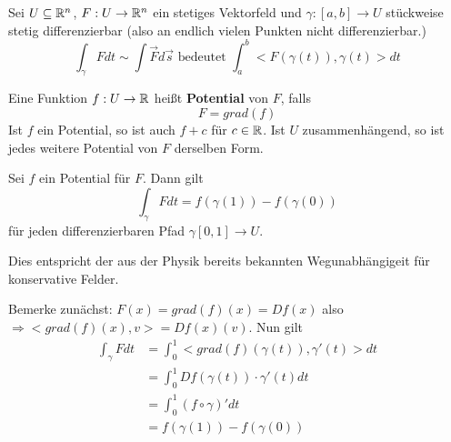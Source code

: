 \documentclass[main.tex]{subfiles}
\begin{document}
\begin{Definition}[Potential]
  Sei $U \subseteq \mathbb{R}^n$, $F : U \to \mathbb{R}^n$ ein stetiges Vektorfeld und $\gamma:[a,b] \to U$ stückweise stetig differenzierbar (also an endlich vielen Punkten nicht differenzierbar.)
  $$\int_\gamma F dt \sim \int \vec{F} d\vec{s} \text{ bedeutet } \int_a^b<F(\gamma(t)),\gamma(t)> dt$$

  Eine Funktion $f:U\to \mathbb{R}$ heißt \textbf{Potential} von $F$, falls
  $$F = grad(f)$$
  Ist $f$ ein Potential, so ist auch $f+c$ für $c \in \mathbb{R}$. Ist $U$ zusammenhängend, so ist jedes weitere Potential von $F$ derselben Form.
\end{Definition}

\begin{Theorem}
  Sei $f$ ein Potential für $F$. Dann gilt
  $$\int_\gamma F dt = f(\gamma(1)) - f(\gamma(0))$$
  für jeden differenzierbaren Pfad $\gamma [0,1] \to U$.

  Dies entspricht der aus der Physik bereits bekannten Wegunabhängigeit für konservative Felder.
\end{Theorem}

\begin{Beweis}
  Bemerke zunächst: $F(x) = grad(f)(x) = Df(x)$ also $\Rightarrow <grad(f)(x),v> = Df(x)(v)$. Nun gilt
  $$\begin{aligned}
    \int_\gamma F dt & = \int_0^1 <grad(f)(\gamma(t)),\gamma'(t)> dt \\
    & = \int_0^1 Df(\gamma(t)) \cdot \gamma'(t) dt \\
    & = \int_0^1 (f \circ \gamma)' dt \\
    & = f(\gamma(1)) - f(\gamma(0))
  \end{aligned}$$
\end{Beweis}
\end{document}
